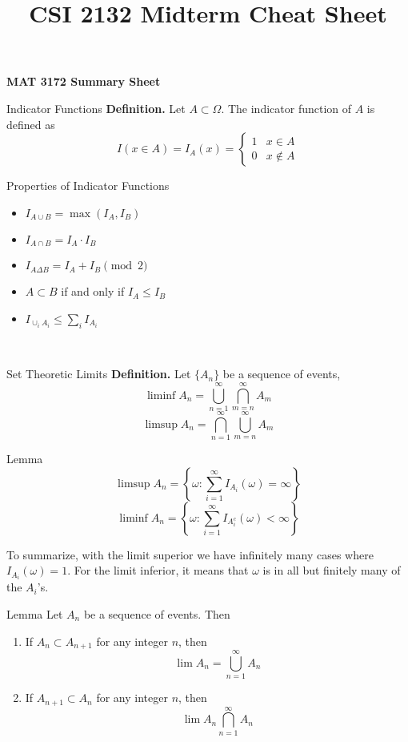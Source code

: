 \documentclass{article}
\title{CSI 2132 Midterm Cheat Sheet}
\begin{document}
\begin{center}{\large{\textbf{MAT 3172 Summary Sheet}}}\\
\end{center}




\begin{multicols*}{3}
\begin{blackbox}{Indicator Functions}
    \textbf{Definition.} Let $A \subset \Omega$. The indicator function of $A$ is defined as 
    \[I(x \in A) = I_A(x) = \begin{cases}
        1 & x \in A \\
        0 & x \notin A
    \end{cases}\]
    \begin{bluebox}{Properties of Indicator Functions}
        \begin{itemize}
            \item $I_{A \cup B} = \max(I_A, I_B)$
            \item $I_{A \cap B} = I_A \cdot I_B$
            \item $I_{A \Delta B} = I_A + I_B \pmod{2}$
            \item $A \subset B$ if and only if $I_A \leq I_B$
            \item $I_{\cup_i A_i} \leq \sum_i I_{A_i}$
        \end{itemize}
    \end{bluebox}\\[-2ex]
\end{blackbox}
\begin{blackbox}{Set Theoretic Limits}
    \textbf{Definition.} Let $\{A_n\}$ be a sequence of events,
    \[\liminf A_n = \bigcup_{n=1}^\infty \bigcap_{m=n}^\infty A_m\]
    \[\limsup A_n = \bigcap_{n=1}^\infty \bigcup_{m=n}^\infty A_m\]
    \begin{redbox}{Lemma}
        \[\limsup A_n = \left\{
            \omega: \sum_{i=1}^\infty I_{A_i}(\omega) = \infty
        \right\}\]
        \[\liminf A_n = \left\{
            \omega: \sum_{i=1}^\infty I_{A_i^c}(\omega) < \infty
        \right\}\]
    \end{redbox}
    To summarize, with the limit superior we have infinitely many cases where
    $I_{A_i} (\omega) = 1$. For the limit inferior, it means that $\omega$ is in all but finitely many of
    the $A_i$’s.
    \begin{brownbox}{Lemma}
        Let ${A_n}$ be a sequence of events. Then
        \begin{enumerate}
            \item If $A_n \subset A_{n+1}$ for any integer $n$, then 
            \[\lim A_n = \bigcup_{n=1}^\infty A_n\]
            \item If $A_{n+1} \subset A_n$ for any integer $n$, then 
            \[\lim A_n \bigcap_{n=1}^\infty A_n\]
        \end{enumerate}
    \end{brownbox}\\[-2ex]
\end{blackbox}


\end{multicols*}
\end{document}
